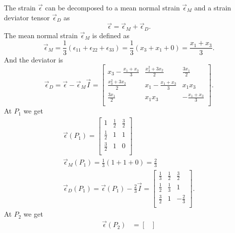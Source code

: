   \begin{derivation}
    The strain $\Vec{\epsilon}$ can be decomposed to a mean normal strain $\Vec{\epsilon}_M$ and a strain deviator tensor $\Vec{\epsilon}_D$ as
    \begin{equation*}
      \Vec{\epsilon} = \Vec{\epsilon}_M + \Vec{\epsilon}_D 
    .\end{equation*}
    The mean normal strain $\Vec{\epsilon}_M$ is defined as
    \begin{equation*}
      \Vec{\epsilon}_M = \frac{1}{3} \left( \epsilon_{11} + \epsilon_{22} + \epsilon_{33} \right) = \frac{1}{3} (x_3 + x_1 + 0) = \frac{x_1 + x_3}{3}
    .\end{equation*}
    And the deviator is
    \begin{equation*}
      \Vec{\epsilon}_D = \Vec{\epsilon} - \Vec{\epsilon}_M \Vec{I} = \begin{bmatrix}
        x_3 - \frac{x_1 + x_3}{3}  & \frac{x_3^2 + 3x_2}{2} & \frac{3x_1}{2}\\
      \frac{x_3^2 + 3x_2}{2} & x_1 - \frac{x_1 + x_3}{3} & x_1 x_3\\
      \frac{3x_1}{2} & x_1x_3 & - \frac{x_1 + x_3}{3}\\
      \end{bmatrix}
    .\end{equation*}
    At $P_1$ we get
    \begin{gather*}
      \Vec{\epsilon}(P_1) = \begin{bmatrix}
        1 & \frac{1}{2} & \frac{3}{2}\\
      \frac{1}{2} & 1 & 1\\
      \frac{3}{2} & 1 & 0\\
      \end{bmatrix} \\
        \Vec{\epsilon}_M(P_1) = \frac{1}{3}(1+1+0) = \frac{2}{3} \\
        \Vec{\epsilon}_D (P_1) = \Vec{\epsilon}(P_1) - \frac{2}{3} \Vec{I} = \begin{bmatrix}
          \frac{1}{3} & \frac{1}{2} & \frac{3}{2}\\
        \frac{1}{2} & \frac{1}{3} & 1\\
        \frac{3}{2} & 1 & - \frac{2}{3}\\
        \end{bmatrix}
    .\end{gather*}
    At $P_2$ we get
    \begin{align*}
      \Vec{\epsilon}(P_2) &= \begin{bmatrix}

\end{bmatrix}
\end{align*}
\end{derivation}
